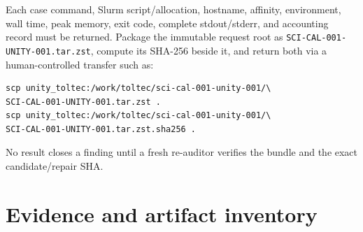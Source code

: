 \documentclass[11pt]{article}
\newcommand{\code}[1]{\nolinkurl{#1}}
\begin{document}
Each case command, Slurm script/allocation, hostname, affinity, environment,
wall time, peak memory, exit code, complete stdout/stderr, and accounting
record must be returned.  Package the immutable request root as
\code{SCI-CAL-001-UNITY-001.tar.zst}, compute its SHA-256 beside it, and return
both via a human-controlled transfer such as:
\begin{small}
\begin{verbatim}
scp unity_toltec:/work/toltec/sci-cal-001-unity-001/\
SCI-CAL-001-UNITY-001.tar.zst .
scp unity_toltec:/work/toltec/sci-cal-001-unity-001/\
SCI-CAL-001-UNITY-001.tar.zst.sha256 .
\end{verbatim}
\end{small}
No result closes a finding until a fresh re-auditor verifies the bundle and
the exact candidate/repair SHA.

\section{Evidence and artifact inventory}
\end{document}
